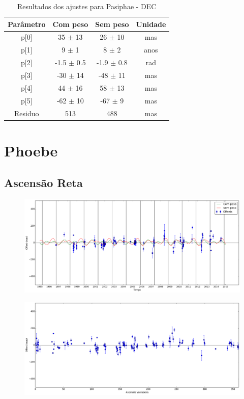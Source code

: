 \documentclass[11pt,a4paper]{report}
\begin{document}
\begin{table}[h!]
\caption{\label{Tab: Pasiphae-DEC} Resultados dos ajustes para Pasiphae - DEC}
\begin{centering}
\begin{tabular}{cccc}
\hline
\hline
Parâmetro & Com peso & Sem peso & Unidade\tabularnewline
\hline
p[0] & 35 $\pm$ 13 & 26 $\pm$ 10 & mas\\
p[1] & 9 $\pm$ 1 & 8 $\pm$ 2 & anos\\
p[2] & -1.5 $\pm$ 0.5 & -1.9 $\pm$ 0.8 & rad\\
p[3] & -30 $\pm$ 14 & -48 $\pm$ 11 & mas\\
p[4] & 44 $\pm$ 16 & 58 $\pm$ 13 & mas\\
p[5] & -62 $\pm$ 10 & -67 $\pm$ 9 & mas\\
Residuo & 513 & 488 & mas\\
\hline 
\end{tabular} 
\par\end{centering}
\end{table}

\chapter*{Phoebe}
\section*{Ascensão Reta}

\begin{figure}[h]
\includegraphics[scale=0.35]{Phoebe/RA.png} 
\end{figure}

\begin{figure}[h]
\includegraphics[scale=0.35]{Phoebe/RA_anom.png}  
\end{figure}
\end{document}

